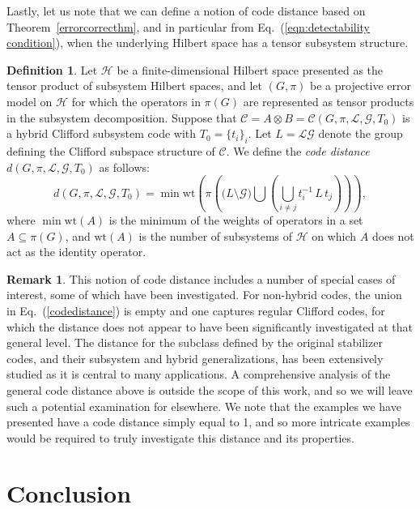 \documentclass[11pt]{article}
\theoremstyle{definition}
\newtheorem{definition}{Definition}
\newtheorem*{remark}{Remark}
\newcommand{\calC}{\mathcal{C}}
\newcommand{\calG}{\mathcal{G}}
\newcommand{\calH}{\mathcal{H}}
\newcommand{\calL}{\mathcal{L}}
\begin{document}
Lastly, let us note that we can define a notion of code distance based on Theorem~\ref{errorcorrecthm}, and in particular from Eq.~(\ref{eqn:detectability condition}), when the underlying Hilbert space has a tensor subsystem structure. 

\begin{definition}\label{def:distance}
    Let $\calH$ be a finite-dimensional Hilbert space presented as the tensor product of subsystem Hilbert spaces, and let $(G,\pi)$ be a projective error model on $\calH$ for which the operators in $\pi(G)$ are represented as tensor products in the subsystem decomposition. Suppose that $\calC = A \otimes B = \calC(G,\pi,\calL,\calG,T_0)$ is a hybrid Clifford subsystem code with $T_0 = \{t_i\}_{i}$. Let $L = \calL\calG$ denote the group defining the Clifford subspace structure of $\calC$. We define the {\it code distance} $d(G,\pi,\calL,\calG,T_0)$ as follows:
    \begin{equation}\label{codedistance}
        d(G,\pi,\calL,\calG,T_0) = \min\mathrm{wt} \left( \pi\left(\big(L \setminus \calG\big) \bigcup \left( \bigcup_{i \neq j} t_i^{-1} \, L \, t_j \right)\right)\right), 
    \end{equation} 
    where $\min \mbox{wt}(A)$ is the minimum of the weights of operators in a set $A \subseteq \pi(G)$, and $\mbox{wt}(A)$ is the number of subsystems of $\mathcal H$ on which $A$ does not act as the identity operator.
\end{definition}

\begin{remark}
    This notion of code distance includes a number of special cases of interest, some of which have been investigated. For non-hybrid codes, the union in Eq.~(\ref{codedistance}) is empty and one captures regular Clifford codes, for which the distance does not appear to have been significantly investigated at that general level. The distance for the subclass defined by the original stabilizer codes, and their subsystem and hybrid generalizations, has been extensively studied as it is central to many applications. A comprehensive analysis of the general code distance above is outside the scope of this work, and so we will leave such a potential examination for elsewhere. We note that the examples we have presented have a code distance simply equal to 1, and so more intricate examples would be required to truly investigate this distance and its properties. 
\end{remark}

\section{Conclusion}
\end{document}
